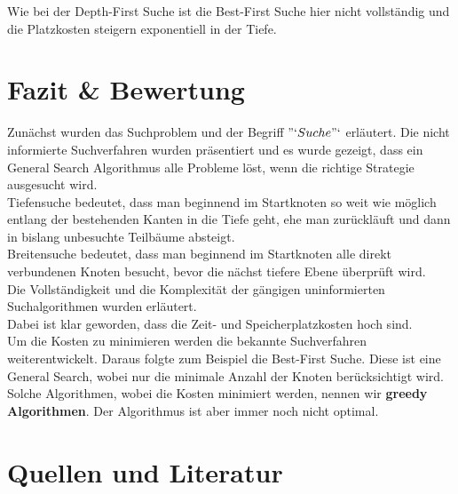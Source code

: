 \documentclass[fleqn]{article}
\numberwithin{equation}{section}
\numberwithin{figure}{section}
\numberwithin{table}{section}
\begin{document}
Wie bei der Depth-First Suche ist die Best-First Suche hier nicht vollständig und die Platzkosten steigern exponentiell in der Tiefe.\\

\newpage
\section{Fazit \& Bewertung}

Zunächst wurden das Suchproblem und der Begriff $"`Suche"`$ erläutert. Die nicht informierte Suchverfahren wurden präsentiert und es wurde gezeigt, dass ein General Search Algorithmus alle Probleme löst, wenn die richtige Strategie ausgesucht wird. \\

Tiefensuche bedeutet, dass man beginnend im Startknoten so weit wie möglich entlang der bestehenden Kanten in die Tiefe geht, ehe man zurückläuft und dann in bislang unbesuchte Teilbäume absteigt.\\

 Breitensuche bedeutet, dass man beginnend im Startknoten alle direkt verbundenen Knoten besucht, bevor die nächst tiefere Ebene überprüft wird.\\

Die Vollständigkeit und die Komplexität der gängigen uninformierten Suchalgorithmen wurden erläutert.\\

Dabei ist klar geworden, dass die Zeit- und Speicherplatzkosten hoch sind. \\

Um die Kosten zu minimieren werden die bekannte Suchverfahren weiterentwickelt. Daraus folgte zum Beispiel die Best-First Suche. Diese ist eine General Search, wobei nur die minimale Anzahl der Knoten berücksichtigt wird.\\  Solche Algorithmen, wobei die Kosten minimiert werden, nennen wir \textbf{greedy Algorithmen}. Der Algorithmus ist aber immer noch nicht optimal.\\

\newpage
\section{Quellen und Literatur}
\end{document}
